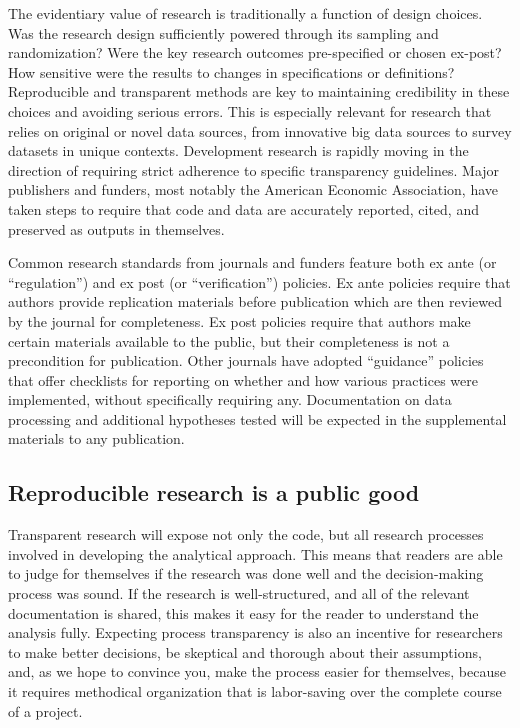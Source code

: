 The evidentiary value of research is traditionally a function of design choices.\cite{angrist2010credibility,ioannidis2005most}
Was the research design sufficiently powered through its sampling and randomization?
Were the key research outcomes pre-specified or chosen ex-post?
How sensitive were the results to changes in specifications or definitions?
Reproducible and transparent methods are key to maintaining credibility
in these choices and avoiding serious errors.\cite{christensen2019transparent}
This is especially relevant for research that relies on original or novel data sources,
from innovative big data sources to survey datasets in unique contexts.
Development research is rapidly moving in the direction of requiring strict adherence
to specific transparency guidelines.
Major publishers and funders, most notably the American Economic Association,
have taken steps to require that code and data
are accurately reported, cited, and preserved as outputs in themselves.

Common research standards from journals and funders feature both ex ante
(or ``regulation'') and ex post (or ``verification'') policies.\cite{stodden2013toward}
Ex ante policies require that authors
provide replication materials before publication
which are then reviewed by the journal for completeness.
Ex post policies require that authors make certain materials available to the public,
but their completeness is not a precondition for publication.
Other journals have adopted ``guidance'' policies that offer checklists
for reporting on whether and how various practices were implemented,
without specifically requiring any.\cite{nosek2015promoting}
Documentation on data processing and additional hypotheses tested
will be expected in the supplemental materials to any publication.

\subsection{Reproducible research is a public good}
Transparent research will expose not only the code,
but all research processes involved in developing the analytical approach.
This means that readers are able to judge for themselves if the research was done well
and the decision-making process was sound.
If the research is well-structured, and all of the relevant documentation
is shared, this makes it easy for the reader to understand the analysis fully.
Expecting process transparency is also an incentive for researchers to make better decisions,
be skeptical and thorough about their assumptions,
and, as we hope to convince you, make the process easier for themselves,
because it requires methodical organization that is labor-saving over the complete course of a project.

